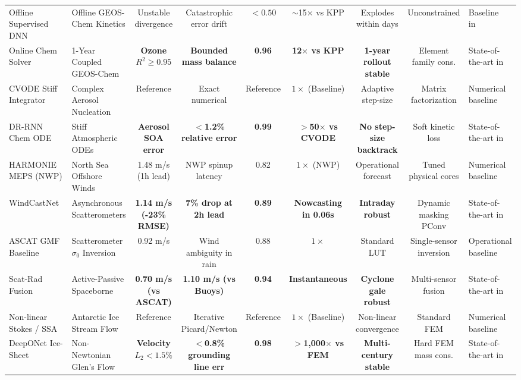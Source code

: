 \begin{table}[t]
{\begin{tabular}{@{}llccccccp{4.2cm}@{}}
Offline Supervised DNN & Offline GEOS-Chem Kinetics & Unstable divergence & Catastrophic error drift & $<0.50$ & $\sim$15$\times$ vs KPP & Explodes within days & Unconstrained & Baseline in~\cite{kelp2022online} \\
Online Chem Solver~\cite{kelp2022online} & 1-Year Coupled GEOS-Chem & \textbf{Ozone $R^2 \ge 0.95$} & \textbf{Bounded mass balance} & \textbf{0.96} & \textbf{12$\times$ vs KPP} & \textbf{1-year rollout stable} & Element family cons. & State-of-the-art in~\cite{kelp2022online} \\
CVODE Stiff Integrator & Complex Aerosol Nucleation & Reference & Exact numerical & Reference & $1\times$ (Baseline) & Adaptive step-size & Matrix factorization & Numerical baseline~\cite{liu2025atmospheric} \\
DR-RNN Chem ODE~\cite{liu2025atmospheric} & Stiff Atmospheric ODEs & \textbf{Aerosol SOA error} & \textbf{$<$1.2\% relative error} & \textbf{0.99} & \textbf{$>$50$\times$ vs CVODE} & \textbf{No step-size backtrack} & Soft kinetic loss & State-of-the-art in~\cite{liu2025atmospheric} \\
HARMONIE MEPS (NWP) & North Sea Offshore Winds & 1.48 m/s (1h lead) & NWP spinup latency & 0.82 & $1\times$ (NWP) & Operational forecast & Tuned physical cores & Numerical baseline~\cite{pinto2026windcastnet} \\
WindCastNet~\cite{pinto2026windcastnet} & Asynchronous Scatterometers & \textbf{1.14 m/s (-23\% RMSE)} & \textbf{7\% drop at 2h lead} & \textbf{0.89} & \textbf{Nowcasting in 0.06s} & \textbf{Intraday robust} & Dynamic masking PConv & State-of-the-art in~\cite{pinto2026windcastnet} \\
ASCAT GMF Baseline & Scatterometer $\sigma_0$ Inversion & 0.92 m/s & Wind ambiguity in rain & 0.88 & $1\times$ & Standard LUT & Single-sensor inversion & Operational baseline~\cite{xiang2024scatterometer} \\
Scat-Rad Fusion~\cite{xiang2024scatterometer} & Active-Passive Spaceborne & \textbf{0.70 m/s (vs ASCAT)} & \textbf{1.10 m/s (vs Buoys)} & \textbf{0.94} & \textbf{Instantaneous} & \textbf{Cyclone gale robust} & Multi-sensor fusion & State-of-the-art in~\cite{xiang2024scatterometer} \\
Non-linear Stokes / SSA & Antarctic Ice Stream Flow & Reference & Iterative Picard/Newton & Reference & $1\times$ (Baseline) & Non-linear convergence & Standard FEM & Numerical baseline~\cite{he2023hybrid} \\
DeepONet Ice-Sheet~\cite{he2023hybrid} & Non-Newtonian Glen's Flow & \textbf{Velocity $L_2 < 1.5\%$} & \textbf{$<$0.8\% grounding line err} & \textbf{0.98} & \textbf{$>$1,000$\times$ vs FEM} & \textbf{Multi-century stable} & Hard FEM mass cons. & State-of-the-art in~\cite{he2023hybrid} \\

\end{tabular}}
\end{table}

